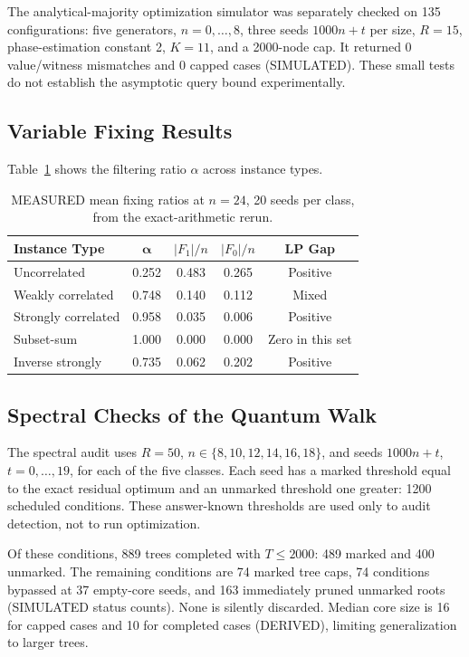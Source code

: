 \documentclass[pdflatex,sn-mathphys-num]{sn-jnl}
\begin{document}
The analytical-majority optimization simulator was separately checked on 135 configurations: five generators, $n=0,\ldots,8$, three seeds $1000n+t$ per size, $R=15$, phase-estimation constant 2, $K=11$, and a 2000-node cap. It returned 0 value/witness mismatches and 0 capped cases (SIMULATED). These small tests do not establish the asymptotic query bound experimentally.

\subsection{Variable Fixing Results}
Table~\ref{tab:fixing} shows the filtering ratio $\alpha$ across instance types.

\begin{table}[htbp]
\caption{MEASURED mean fixing ratios at $n=24$, 20 seeds per class, from the exact-arithmetic rerun.}
\label{tab:fixing}

\begin{tabular}{lcccc}
\toprule
\textbf{Instance Type} & $\boldsymbol{\alpha}$ & $|F_1|/n$ & $|F_0|/n$ & \textbf{LP Gap} \\
\midrule
Uncorrelated & 0.252 & 0.483 & 0.265 & Positive \\
Weakly correlated & 0.748 & 0.140 & 0.112 & Mixed \\
Strongly correlated & 0.958 & 0.035 & 0.006 & Positive \\
Subset-sum & 1.000 & 0.000 & 0.000 & Zero in this set \\
Inverse strongly & 0.735 & 0.062 & 0.202 & Positive \\
\bottomrule
\end{tabular}

\end{table}


\subsection{Spectral Checks of the Quantum Walk}
The spectral audit uses $R=50$, $n\in\{8,10,12,14,16,18\}$, and seeds $1000n+t$, $t=0,\ldots,19$, for each of the five classes. Each seed has a marked threshold equal to the exact residual optimum and an unmarked threshold one greater: 1200 scheduled conditions. These answer-known thresholds are used only to audit detection, not to run optimization.

Of these conditions, 889 trees completed with $T\le2000$: 489 marked and 400 unmarked. The remaining conditions are 74 marked tree caps, 74 conditions bypassed at 37 empty-core seeds, and 163 immediately pruned unmarked roots (SIMULATED status counts). None is silently discarded. Median core size is 16 for capped cases and 10 for completed cases (DERIVED), limiting generalization to larger trees.
\end{document}
